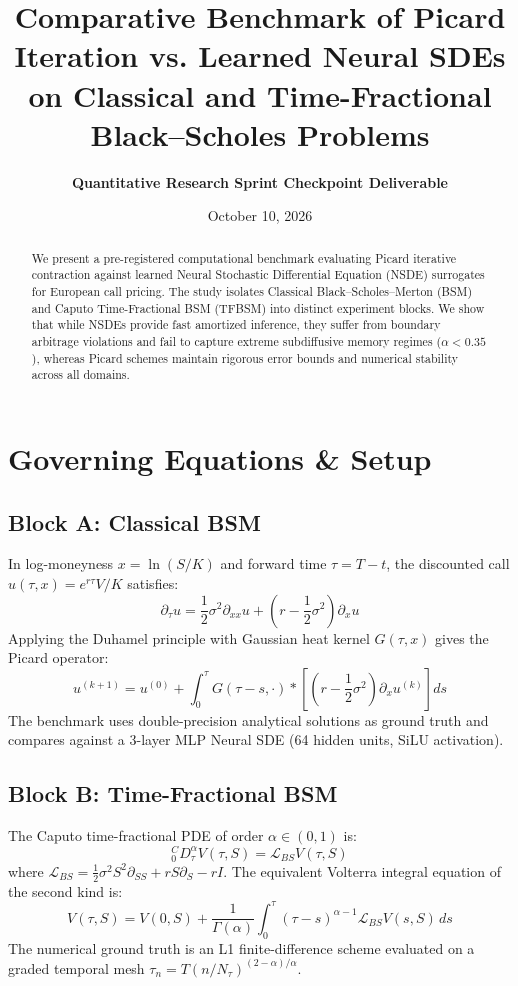 \documentclass[10pt,twocolumn,a4paper]{article}
\title{\textbf{Comparative Benchmark of Picard Iteration vs. Learned Neural SDEs on Classical and Time-Fractional Black--Scholes Problems}}
\author{\textbf{Quantitative Research Sprint Checkpoint Deliverable}}
\date{October 10, 2026}
\begin{document}
\maketitle

\begin{abstract}
We present a pre-registered computational benchmark evaluating Picard iterative contraction against learned Neural Stochastic Differential Equation (NSDE) surrogates for European call pricing. The study isolates Classical Black--Scholes--Merton (BSM) and Caputo Time-Fractional BSM (TFBSM) into distinct experiment blocks. We show that while NSDEs provide fast amortized inference, they suffer from boundary arbitrage violations and fail to capture extreme subdiffusive memory regimes ($\alpha < 0.35$), whereas Picard schemes maintain rigorous error bounds and numerical stability across all domains.
\end{abstract}

\section{Governing Equations \& Setup}
\subsection{Block A: Classical BSM}
In log-moneyness $x = \ln(S/K)$ and forward time $\tau = T - t$, the discounted call $u(\tau, x) = e^{r\tau} V/K$ satisfies:
\begin{equation}
\partial_\tau u = \frac{1}{2}\sigma^2 \partial_{xx} u + \left(r - \frac{1}{2}\sigma^2\right)\partial_x u
\end{equation}
Applying the Duhamel principle with Gaussian heat kernel $G(\tau, x)$ gives the Picard operator:
\begin{equation}
u^{(k+1)} = u^{(0)} + \int_0^\tau G(\tau-s, \cdot) * \left[\left(r - \frac{1}{2}\sigma^2\right) \partial_x u^{(k)}\right] ds
\end{equation}
The benchmark uses double-precision analytical solutions as ground truth and compares against a 3-layer MLP Neural SDE (64 hidden units, SiLU activation).

\subsection{Block B: Time-Fractional BSM}
The Caputo time-fractional PDE of order $\alpha \in (0, 1)$ is:
\begin{equation}
{}_0^C D_\tau^\alpha V(\tau, S) = \mathcal{L}_{BS} V(\tau, S)
\end{equation}
where $\mathcal{L}_{BS} = \frac{1}{2}\sigma^2 S^2 \partial_{SS} + r S \partial_S - r I$. The equivalent Volterra integral equation of the second kind is:
\begin{equation}
V(\tau, S) = V(0, S) + \frac{1}{\Gamma(\alpha)} \int_0^\tau (\tau - s)^{\alpha - 1} \mathcal{L}_{BS} V(s, S) \, ds
\end{equation}
The numerical ground truth is an L1 finite-difference scheme evaluated on a graded temporal mesh $\tau_n = T(n/N_\tau)^{(2-\alpha)/\alpha}$.
\end{document}
